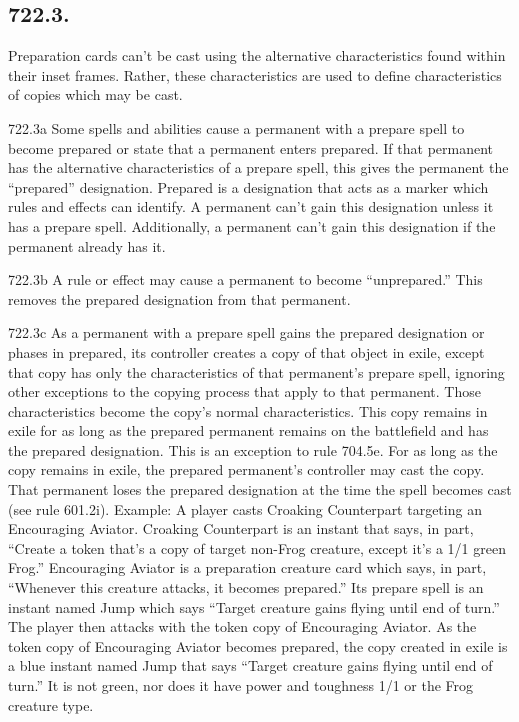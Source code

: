\subsection*{722.3.}
Preparation cards can’t be cast using the alternative characteristics found within their inset frames. Rather, these characteristics are used to define characteristics of copies which may be cast.

722.3a Some spells and abilities cause a permanent with a prepare spell to become prepared or state that a permanent enters prepared. If that permanent has the alternative characteristics of a prepare spell, this gives the permanent the “prepared” designation. Prepared is a designation that acts as a marker which rules and effects can identify. A permanent can’t gain this designation unless it has a prepare spell. Additionally, a permanent can’t gain this designation if the permanent already has it.

722.3b A rule or effect may cause a permanent to become “unprepared.” This removes the prepared designation from that permanent.

722.3c As a permanent with a prepare spell gains the prepared designation or phases in prepared, its controller creates a copy of that object in exile, except that copy has only the characteristics of that permanent’s prepare spell, ignoring other exceptions to the copying process that apply to that permanent. Those characteristics become the copy’s normal characteristics. This copy remains in exile for as long as the prepared permanent remains on the battlefield and has the prepared designation. This is an exception to rule 704.5e. For as long as the copy remains in exile, the prepared permanent’s controller may cast the copy. That permanent loses the prepared designation at the time the spell becomes cast (see rule 601.2i).
Example: A player casts Croaking Counterpart targeting an Encouraging Aviator. Croaking Counterpart is an instant that says, in part, “Create a token that’s a copy of target non-Frog creature, except it’s a 1/1 green Frog.” Encouraging Aviator is a preparation creature card which says, in part, “Whenever this creature attacks, it becomes prepared.” Its prepare spell is an instant named Jump which says “Target creature gains flying until end of turn.” The player then attacks with the token copy of Encouraging Aviator. As the token copy of Encouraging Aviator becomes prepared, the copy created in exile is a blue instant named Jump that says “Target creature gains flying until end of turn.” It is not green, nor does it have power and toughness 1/1 or the Frog creature type.

